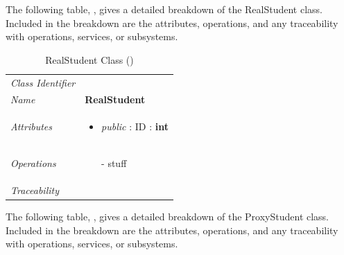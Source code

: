 \documentclass[12pt,letterpaper]{article}
\begin{document}
The following table, , gives a detailed breakdown of the RealStudent class. Included in the breakdown are the attributes, operations, and any traceability with operations, services, or subsystems.

\begin{table}[H]
    \caption{RealStudent Class ()} 
	\begin{tabu} to 
		\toprule
		Class Identifier &  \\
		Name & {\bf RealStudent} \\
		Attributes & 
		\begin{minipage}[t]{\linewidth}
		    \begin{itemize}
		        \item \textit{public} : ID : \bf{int}
			\end{itemize}
	    \end{minipage} \\

		Operations &
		\begin{minipage}[t]{\linewidth}
			\begin{enumerate}
			    \item[-] stuff
	        \end{enumerate}
	    \end{minipage} \\
	    	Traceability & \\
		\toprule
	\end{tabu}
\end{table}

The following table, , gives a detailed breakdown of the ProxyStudent class. Included in the breakdown are the attributes, operations, and any traceability with operations, services, or subsystems.
\end{document}
